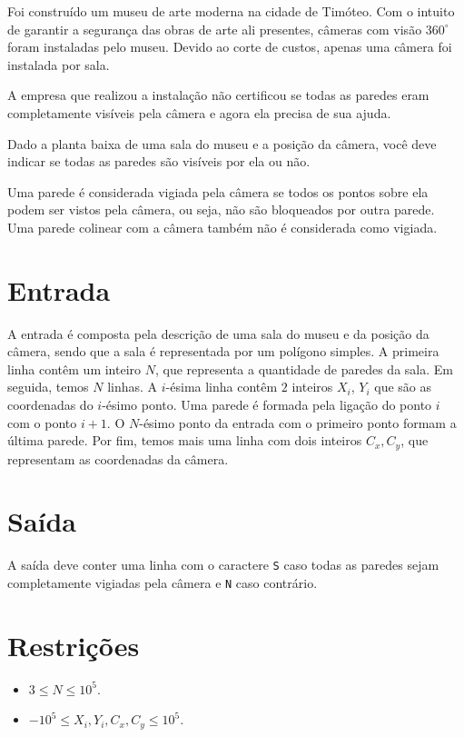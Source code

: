Foi construído um museu de arte moderna na cidade de Timóteo. Com o intuito de garantir a segurança das obras
de arte ali presentes, câmeras com visão $360 ^{\circ}$ foram instaladas pelo museu.
Devido ao corte de custos, apenas uma câmera foi instalada por sala.

A empresa que realizou a instalação não certificou se todas as paredes eram completamente visíveis pela câmera e agora ela precisa de sua ajuda.

Dado a planta baixa de uma sala do museu e a posição da câmera, você deve indicar se todas as paredes são visíveis por ela ou não.

Uma parede é considerada vigiada pela câmera se todos os pontos sobre ela podem ser vistos pela câmera, ou seja, não são bloqueados por outra parede.
Uma parede colinear com a câmera também não é considerada como vigiada.


\section*{Entrada}

A entrada é composta pela descrição de uma sala do museu e da posição da câmera, sendo que a sala é
representada por um polígono simples.
A primeira linha contêm um inteiro $N$, que representa a quantidade de paredes da sala.
Em seguida, temos $N$ linhas. A $i$-ésima linha contêm $2$ inteiros $X_i$, $Y_i$ que são as coordenadas do $i$-ésimo ponto.
Uma parede é formada pela ligação do ponto $i$ com o ponto $i+1$. O $N$-ésimo ponto da entrada com o primeiro ponto formam a última parede.
Por fim, temos mais uma linha com dois inteiros $C_x, C_y$, que representam as coordenadas da câmera.

\section*{Saída}

A saída deve conter uma linha com o caractere \texttt{S} caso todas as paredes sejam completamente vigiadas pela câmera e \texttt{N} caso contrário.

\section*{Restrições}

\begin{itemize}
    \item $3 \leq N \leq 10^5$.
    \item $-10^5 \leq X_i, Y_i, C_x, C_y \leq 10^5$.
\end{itemize}

